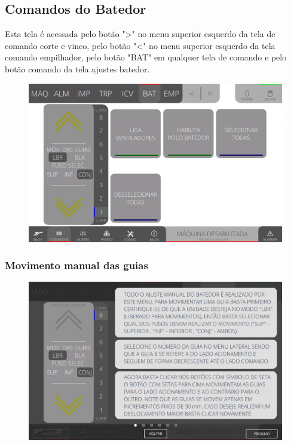 \thispagestyle{fancy}
\vspace*{40 pt}
\subsection{Comandos do Batedor} \label{sec:comandosBatedor}
Esta tela é acessada pelo botão "\textgreater" no menu superior esquerdo da tela de comando corte e vinco, pelo botão "\textless{}" no menu superior esquerdo da tela comando empilhador, pelo botão "BAT" em qualquer tela de comando e pelo botão comando da tela ajustes batedor.
\vspace*{\fill}
\begin{figure}[h]
    \centering
    \includegraphics[width=480 px,height=300 px]{src/imagesICV/07-scout/commands/e-Tela-Principal.png}
\end{figure}
\vspace*{\fill}

\newpage
\thispagestyle{fancy}
\vspace*{40 pt}
\subsubsection{\small{Movimento manual das guias}} \label{sec:comandosBatedorMovimentoManualGuias}
\vspace*{\fill}
\begin{figure}[h]
    \centering
    \includegraphics[width=576 px,height=360 px]{src/imagesICV/07-scout/commands/1.png}
\end{figure}
\vspace*{\fill}

